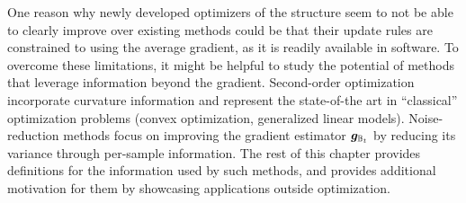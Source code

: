 One reason why newly developed optimizers of the structure
 seem to not be able to clearly improve
over existing methods could be that their update rules are constrained to using
the average gradient, as it is readily available in software. To overcome these
limitations, it might be helpful to study the potential of methods that leverage
information beyond the gradient. Second-order optimization incorporate curvature
information and represent the state-of-the art in ``classical'' optimization
problems (convex optimization, generalized linear models). Noise-reduction
methods focus on improving the gradient estimator ${\bm{g}}_{{\mathbb{B}}_t}$ by reducing its
variance through per-sample information. The rest of this chapter provides
definitions for the information used by such methods, and provides additional
motivation for them by showcasing applications outside optimization.

